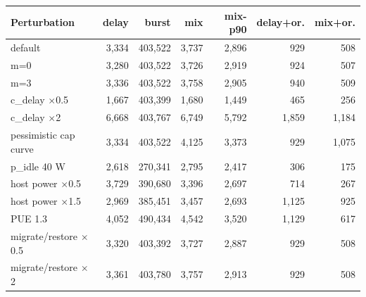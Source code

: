 \begin{tabular}{lrrrrrr}
\toprule
Perturbation & delay & burst & mix & mix-p90 & delay+or. & mix+or. \\
\midrule
default & 3,334 & 403,522 & 3,737 & 2,896 & 929 & 508 \\
m=0 & 3,280 & 403,522 & 3,726 & 2,919 & 924 & 507 \\
m=3 & 3,336 & 403,522 & 3,758 & 2,905 & 940 & 509 \\
c\_delay $\times$0.5 & 1,667 & 403,399 & 1,680 & 1,449 & 465 & 256 \\
c\_delay $\times$2 & 6,668 & 403,767 & 6,749 & 5,792 & 1,859 & 1,184 \\
pessimistic cap curve & 3,334 & 403,522 & 4,125 & 3,373 & 929 & 1,075 \\
p\_idle 40 W & 2,618 & 270,341 & 2,795 & 2,417 & 306 & 175 \\
host power $\times$0.5 & 3,729 & 390,680 & 3,396 & 2,697 & 714 & 267 \\
host power $\times$1.5 & 2,969 & 385,451 & 3,457 & 2,693 & 1,125 & 925 \\
PUE 1.3 & 4,052 & 490,434 & 4,542 & 3,520 & 1,129 & 617 \\
migrate/restore $\times$0.5 & 3,320 & 403,392 & 3,727 & 2,887 & 929 & 508 \\
migrate/restore $\times$2 & 3,361 & 403,780 & 3,757 & 2,913 & 929 & 508 \\
\bottomrule
\end{tabular}
